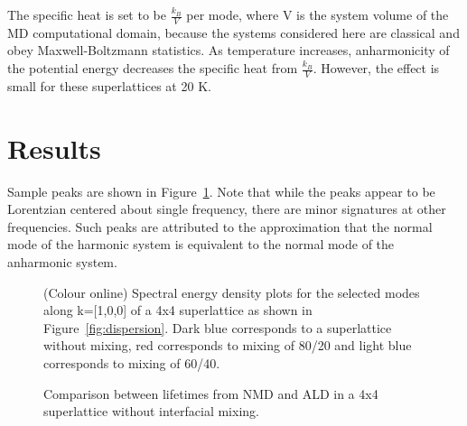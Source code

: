 \documentclass[aps,prb,preprint,preprintnumbers,amsmath,amssymb,floatfix,superscriptaddress]{revtex4}
\begin{document}
The specific heat is set to be $\frac{k_B}{V}$ per mode, where V is the system volume of the MD computational domain, because the systems considered here are classical and obey Maxwell-Boltzmann statistics. As temperature increases, anharmonicity of the potential energy decreases the specific heat from $\frac{k_B}{V}$. However, the effect is small for these superlattices at 20 K.

\section{Results}
\renewcommand{\topfraction}{0.7}
\begin{figure*}[ht!]
\begin{center}
\renewcommand{\figure}{Fig.}
\caption{Dispersion of a 4x4 superlattice for modes normal to the interfaces. Red squares represent select modes for k=[1,0,0].}
\label{fig:dispersion}
\end{center}
\end{figure*}
Sample peaks are shown in Figure~\ref{fig:sed}. Note that while the peaks appear to be Lorentzian centered about single frequency, there are minor signatures at other frequencies. Such peaks are attributed to the approximation that the normal mode of the harmonic system is equivalent to the normal mode of the anharmonic system.
\begin{figure}[!h]
\begin{center}
\renewcommand{\figure}{Fig.}
\caption{(Colour online) Spectral energy density plots for the selected modes along k=[1,0,0] of a 4x4 superlattice as shown in Figure~\ref{fig:dispersion}. Dark blue corresponds to a superlattice without mixing, red corresponds to mixing of 80/20 and light blue corresponds to mixing of 60/40.}
\label{fig:sed}
\end{center}
\end{figure}
\begin{figure}%
\begin{center}
\renewcommand{\figure}{Fig.}
\caption{Comparison between lifetimes from NMD and ALD in a 4x4 superlattice without interfacial mixing.}
\label{FIG:NMD_v_ALD}
\end{center}
\end{figure}
\end{document}
